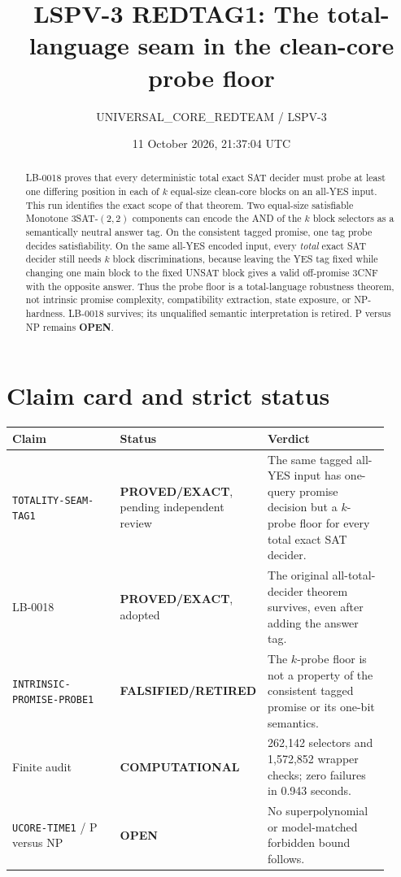 \documentclass[11pt]{article}
\title{LSPV-3 REDTAG1: The total-language seam in the clean-core probe floor}
\author{UNIVERSAL\_CORE\_REDTEAM / LSPV-3}
\date{11 October 2026, 21:37:04 UTC}
\newcommand{\EXACT}{\textbf{PROVED/EXACT}}
\newcommand{\COMP}{\textbf{COMPUTATIONAL}}
\newcommand{\OPEN}{\textbf{OPEN}}
\newcommand{\RETIRED}{\textbf{FALSIFIED/RETIRED}}
\begin{document}
\maketitle

\begin{abstract}
LB-0018 proves that every deterministic total exact SAT decider must probe at
least one differing position in each of $k$ equal-size clean-core blocks on an
all-YES input.  This run identifies the exact scope of that theorem.  Two
equal-size satisfiable Monotone $3$SAT-$(2,2)$ components can encode the AND of
the $k$ block selectors as a semantically neutral answer tag.  On the
consistent tagged promise, one tag probe decides satisfiability.  On the same
all-YES encoded input, every \emph{total} exact SAT decider still needs $k$
block discriminations, because leaving the YES tag fixed while changing one
main block to the fixed UNSAT block gives a valid off-promise $3$CNF with the
opposite answer.  Thus the probe floor is a total-language robustness theorem,
not intrinsic promise complexity, compatibility extraction, state exposure,
or NP-hardness.  LB-0018 survives; its unqualified semantic interpretation is
retired.  P versus NP remains \OPEN.
\end{abstract}

\section{Claim card and strict status}

\begin{center}\small
\begin{tabular}{p{0.35\linewidth}p{0.20\linewidth}p{0.37\linewidth}}
\toprule
Claim & Status & Verdict\\
\midrule
\texttt{TOTALITY-SEAM-TAG1} & \EXACT, pending independent review &
The same tagged all-YES input has one-query promise decision but a $k$-probe
floor for every total exact SAT decider.\\
LB-0018 & \EXACT, adopted & The original all-total-decider theorem survives,
even after adding the answer tag.\\
\texttt{INTRINSIC-PROMISE-PROBE1} & \RETIRED & The $k$-probe floor is not a
property of the consistent tagged promise or its one-bit semantics.\\
Finite audit & \COMP & 262,142 selectors and 1,572,852 wrapper checks; zero
failures in 0.943 seconds.\\
\texttt{UCORE-TIME1} / P versus NP & \OPEN & No superpolynomial or
model-matched forbidden bound follows.\\
\bottomrule
\end{tabular}
\end{center}
\end{document}
